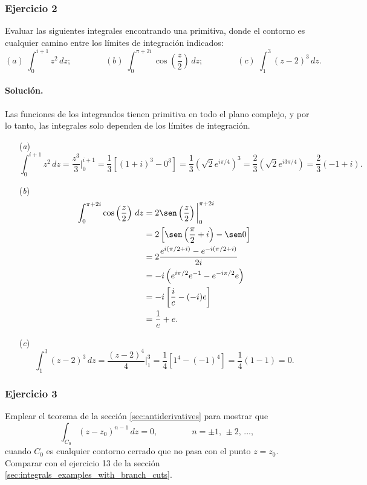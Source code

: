 \documentclass[a4paper]{report}
\begin{document}
\subsubsection*{Ejercicio 2}

Evaluar las siguientes integrales encontrando una primitiva, donde el contorno es cualquier camino entre los límites de integración indicados:
\[
 (\textit{a})\;\int_0^{i+1}z^2\,dz;\qquad\qquad(\textit{b})\;\int_0^{\pi+2i}\cos\left(\frac{z}{2}\right)\,dz;
 \qquad\qquad(\textit{c})\;\int_1^3(z-2)^3\,dz.
\]

\paragraph{Solución.} Las  funciones de los integrandos tienen primitiva en todo el plano complejo, y por lo tanto, las integrales solo dependen de los límites de integración.
\begin{enumerate}
 \item[(\textit{a})] 
 \[
  \int_0^{i+1}z^2\,dz=\frac{z^3}{3}\bigg|_0^{i+1}=\frac{1}{3}\left[(1+i)^3-0^3\right]=\frac{1}{3}\left(\sqrt{2}e^{i\pi/4}\right)^3
  =\frac{2}{3}\left(\sqrt{2}e^{i3\pi/4}\right)=\frac{2}{3}(-1+i).
 \]
 \item[(\textit{b})] 
 \begin{align*}
  \int_0^{\pi+2i}\cos\left(\frac{z}{2}\right)\,dz&=2\sen\left(\frac{z}{2}\right)\bigg|_0^{\pi+2i}\\
   &=2\left[\sen\left(\frac{\pi}{2}+i\right)-\sen0\right]\\
   &=2\frac{e^{i(\pi/2+i)}-e^{-i(\pi/2+i)}}{2i}\\
   &=-i\left(e^{i\pi/2}e^{-1}-e^{-i\pi/2}e\right)\\
   &=-i\left[\frac{i}{e}-(-i)e\right]\\
   &=\frac{1}{e}+e.
 \end{align*}
 \item[(\textit{c})]
 \[
  \int_1^3(z-2)^3\,dz=\frac{(z-2)^4}{4}\bigg|_1^3=\frac{1}{4}\left[1^4-(-1)^4\right]=\frac{1}{4}(1-1)=0.
 \]
\end{enumerate}

\subsubsection*{Ejercicio 3}

Emplear el teorema de la sección \ref{sec:antiderivatives} para mostrar que 
\[
 \int_{C_0}(z-z_0)^{n-1}\,dz=0,
 \qquad\qquad
 n=\pm1,\,\pm2,\,\dots,
\]
cuando \(C_0\) es cualquier contorno cerrado que no pasa con el punto \(z=z_0\). Comparar con el ejercicio 13 de la sección \ref{sec:integrals_examples_with_branch_cuts}.
\end{document}
